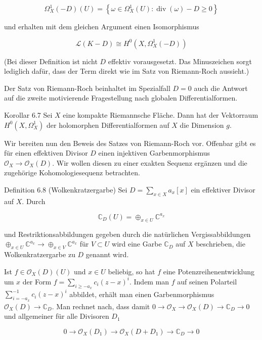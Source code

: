\documentclass[10pt, letterpaper]{article}
\begin{document}
$$
\Omega_{X}^{1}(-D)(U)=\left\{\omega \in \Omega_{X}^{1}(U): \operatorname{div}(\omega)-D \geq 0\right\}
$$

und erhalten mit dem gleichen Argument einen Isomorphismus

$$
\mathcal{L}(K-D) \cong H^{0}\left(X, \Omega_{X}^{1}(-D)\right)
$$

(Bei dieser Definition ist nicht $D$ effektiv vorausgesetzt. Das Minuszeichen sorgt lediglich dafür, dass der Term direkt wie im Satz von Riemann-Roch aussieht.)

Der Satz von Riemann-Roch beinhaltet im Spezialfall $D=0$ auch die Antwort auf die zweite motivierende Fragestellung nach globalen Differentialformen.

Korollar 6.7 Sei $X$ eine kompakte Riemannsche Fläche. Dann hat der Vektorraum $H^{0}\left(X, \Omega_{X}^{1}\right)$ der holomorphen Differentialformen auf $X$ die Dimension $g$.

Wir bereiten nun den Beweis des Satzes von Riemann-Roch vor. Offenbar gibt es für einen effektiven Divisor $D$ einen injektiven Garbenmorphismus $\mathcal{O}_{X} \rightarrow \mathcal{O}_{X}(D)$. Wir wollen diesen zu einer exakten Sequenz ergänzen und die zugehörige Kohomologiesequenz betrachten.

Definition 6.8 (Wolkenkratzergarbe) Sei $D=\sum_{x \in X} a_{x}[x]$ ein effektiver Divisor auf $X$. Durch

$$
\mathbb{C}_{D}(U)=\oplus_{x \in U} \mathbb{C}^{a_{x}}
$$

und Restriktionsabbildungen gegeben durch die natürlichen Vergissabbildungen $\oplus_{x \in U} \mathbb{C}^{a_{x}} \rightarrow \oplus_{x \in V} \mathbb{C}^{a_{x}}$ für $V \subset U$ wird eine Garbe $\mathbb{C}_{D}$ auf $X$ beschrieben, die Wolkenkratzergarbe zu $D$ genannt wird.

Ist $f \in \mathcal{O}_{X}(D)(U)$ und $x \in U$ beliebig, so hat $f$ eine Potenzreihenentwicklung um $x$ der Form $f=\sum_{i \geq-a_{x}} c_{i}(z-x)^{i}$. Indem man $f$ auf seinen Polarteil $\sum_{i=-a_{x}}^{-1} c_{i}(z-x)^{i}$ abbildet, erhält man einen Garbenmorphismus $\mathcal{O}_{X}(D) \rightarrow \mathbb{C}_{D}$. Man rechnet nach, dass damit $0 \rightarrow \mathcal{O}_{X} \rightarrow \mathcal{O}_{X}(D) \rightarrow \mathbb{C}_{D} \rightarrow 0$ und allgemeiner für alle Divisoren $D_{1}$

$$
0 \rightarrow \mathcal{O}_{X}\left(D_{1}\right) \rightarrow \mathcal{O}_{X}\left(D+D_{1}\right) \rightarrow \mathbb{C}_{D} \rightarrow 0
$$
\end{document}
